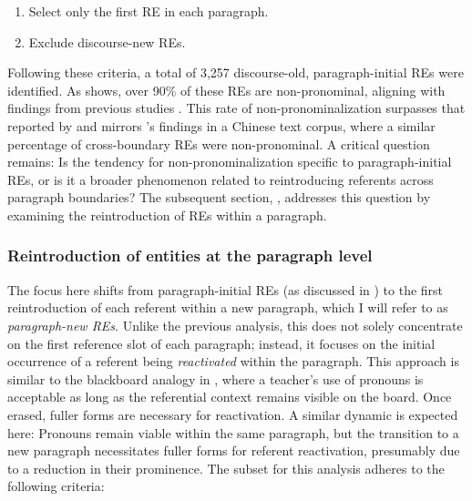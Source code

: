 \begin{enumerate}
	\item Select only the first RE in each paragraph.
	\item Exclude discourse-new REs.
\end{enumerate}


Following these criteria, a total of 3,257 discourse-old, paragraph-initial REs were identified. As  shows, over 90\% of these REs are non-pronominal, aligning with findings from previous studies \citep{Tomlin1987cognitive, Pu2019}. This rate of non-pronominalization surpasses that reported by \citet{ariel1990accessing} and mirrors \citet{Pu2019}'s findings in a Chinese text corpus, where a similar percentage of cross-boundary REs were non-pronominal. A critical question remains: Is the tendency for non-pronominalization specific to paragraph-initial REs, or is it a broader phenomenon related to reintroducing referents across paragraph boundaries? The subsequent section, , addresses this question by examining the reintroduction of REs within a paragraph.






\subsubsection{Reintroduction of entities at the paragraph level}\label{subsubsec:acrossboundarynewness}

The focus here shifts from paragraph-initial REs (as discussed in ) to the first reintroduction of each referent within a new paragraph, which I will refer to as \textit{paragraph-new REs}. Unlike the previous analysis, this does not solely concentrate on the first reference slot of each paragraph; instead, it focuses on the initial occurrence of a referent being \textit{reactivated} within the paragraph. This approach is similar to the blackboard analogy in , where a teacher's use of pronouns is acceptable as long as the referential context remains visible on the board. Once erased, fuller forms are necessary for reactivation. A similar dynamic is expected here: Pronouns remain viable within the same paragraph, but the transition to a new paragraph necessitates fuller forms for referent reactivation, presumably due to a reduction in their prominence. The subset for this analysis adheres to the following criteria:

